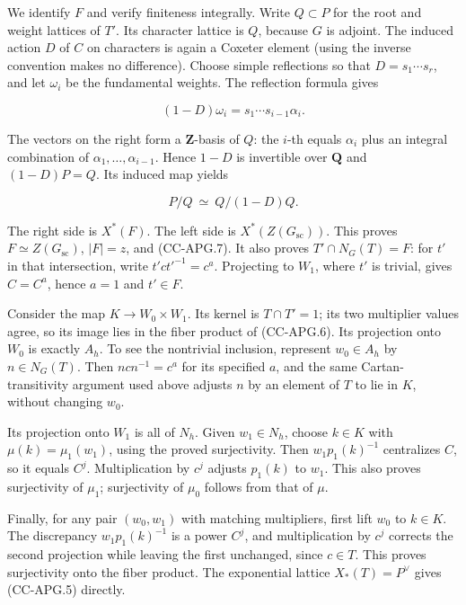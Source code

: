 \documentclass[11pt,a4paper]{article}
\theoremstyle{definition}\newtheorem{definition}[theorem]{Definition}
\theoremstyle{remark}\newtheorem{remark}[theorem]{Remark}
\begin{document}
We identify \(F\) and verify finiteness integrally. Write \(Q\subset P\)
for the root and weight lattices of \(T'\). Its character lattice is
\(Q\), because \(G\) is adjoint. The induced action \(D\) of \(C\) on
characters is again a Coxeter element (using the inverse convention
makes no difference). Choose simple reflections so that
\(D=s_1\cdots s_r\), and let \(\omega_i\) be the fundamental weights.
The reflection formula gives

\[
 (1-D)\omega_i=s_1\cdots s_{i-1}\alpha_i.
 \tag{CC-APG.13}
\]

The vectors on the right form a \(\mathbf Z\)-basis of \(Q\): the
\(i\)-th equals \(\alpha_i\) plus an integral combination of
\(\alpha_1,\ldots,\alpha_{i-1}\). Hence \(1-D\) is invertible over
\(\mathbf Q\) and \((1-D)P=Q\). Its induced map yields

\[
 P/Q \ \simeq\ Q/(1-D)Q.
 \tag{CC-APG.14}
\]

The right side is \(X^*(F)\). The left side is
\(X^*(Z(G_{\mathrm{sc}}))\). This proves \(F\simeq Z(G_{\mathrm{sc}})\),
\(|F|=z\), and (CC-APG.7). It also proves \(T'\cap N_G(T)=F\): for
\(t'\) in that intersection, write \(t'ct'^{-1}=c^a\). Projecting to
\(W_1\), where \(t'\) is trivial, gives \(C=C^a\), hence \(a=1\) and
\(t'\in F\).

Consider the map \(K\to W_0\times W_1\). Its kernel is \(T\cap T'=1\);
its two multiplier values agree, so its image lies in the fiber product
of (CC-APG.6). Its projection onto \(W_0\) is exactly \(A_h\). To see
the nontrivial inclusion, represent \(w_0\in A_h\) by \(n\in N_G(T)\).
Then \(ncn^{-1}=c^a\) for its specified \(a\), and the same
Cartan-transitivity argument used above adjusts \(n\) by an element of
\(T\) to lie in \(K\), without changing \(w_0\).

Its projection onto \(W_1\) is all of \(N_h\). Given \(w_1\in N_h\),
choose \(k\in K\) with \(\mu(k)=\mu_1(w_1)\), using the proved
surjectivity. Then \(w_1p_1(k)^{-1}\) centralizes \(C\), so it equals
\(C^j\). Multiplication by \(c^j\) adjusts \(p_1(k)\) to \(w_1\). This
also proves surjectivity of \(\mu_1\); surjectivity of \(\mu_0\) follows
from that of \(\mu\).

Finally, for any pair \((w_0,w_1)\) with matching multipliers, first
lift \(w_0\) to \(k\in K\). The discrepancy \(w_1p_1(k)^{-1}\) is a
power \(C^j\), and multiplication by \(c^j\) corrects the second
projection while leaving the first unchanged, since \(c\in T\). This
proves surjectivity onto the fiber product. The exponential lattice
\(X_*(T)=P^\vee\) gives (CC-APG.5) directly.
\end{document}
